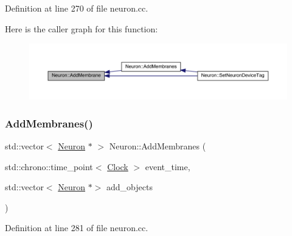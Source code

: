 Definition at line 270 of file neuron.\+cc.

Here is the caller graph for this function\+:
\nopagebreak
\begin{figure}[H]
\begin{center}
\leavevmode
\includegraphics[width=350pt]{class_neuron_a99d4b64f128e2bfbffec3c5d476a2ca3_icgraph}
\end{center}
\end{figure}
\mbox{\label{class_neuron_a9e1f79bf8e991893f4ef318841932a13}} 
\subsubsection{\texorpdfstring{Add\+Membranes()}{AddMembranes()}}
{\footnotesize\ttfamily std\+::vector$<$ \hyperlink{class_neuron}{Neuron} $\ast$ $>$ Neuron\+::\+Add\+Membranes (\begin{DoxyParamCaption}\item[{std\+::chrono\+::time\+\_\+point$<$ \hyperlink{universe_8h_a0ef8d951d1ca5ab3cfaf7ab4c7a6fd80}{Clock} $>$}]{event\+\_\+time,  }\item[{std\+::vector$<$ \hyperlink{class_neuron}{Neuron} $\ast$$>$}]{add\+\_\+objects }\end{DoxyParamCaption})}



Definition at line 281 of file neuron.\+cc.

